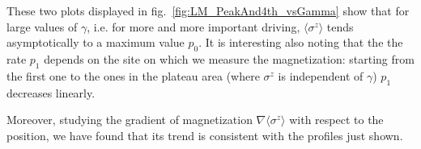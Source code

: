 These two plots displayed in fig.~\ref{fig:LM_PeakAnd4th_vsGamma} show that for large values of $\gamma$, i.e. for more and more important driving, $\langle\sigma^z\rangle$ tends asymptotically to a maximum value $p_0$. It is interesting also noting that the the rate $p_1$ depends on the site on which we measure the magnetization: starting from the first one to the ones in the plateau area (where $\sigma^z$ is independent of $\gamma$) $p_1$ decreases linearly.

Moreover, studying the gradient of magnetization $\nabla \langle \sigma^z \rangle$ with respect to the position, we have found that its trend is consistent with the profiles just shown.






